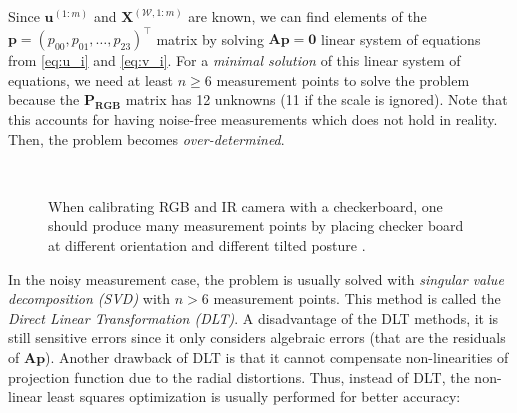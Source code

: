 \documentclass[12pt]{report}
\numberwithin{figure}{section}
\begin{document}
Since $\mathbf{u}^{(1:m)}$ and $\mathbf{X}^{(\mathcal{W}, 1:m)}$ are known, we 
can 
find 
elements of the 
$\mathbf{p} = (p_{00}, p_{01}, \dots, p_{23})^\top$ matrix by solving 
$\mathbf{Ap=0}$ linear system of equations from \eqref{eq:u_i} and 
\eqref{eq:v_i}.  
For a \textit{minimal solution} of this linear system of equations, we need at 
least $n \geq 6$ measurement points to solve the problem because the 
$\mathbf{P_{RGB}}$ matrix has 12 unknowns (11 if the scale is ignored).  Note 
that 
this accounts for having noise-free measurements which does not hold in 
reality. Then, the problem becomes \textit{over-determined}.

\begin{figure}[H]
\centering
{} \\
\caption[Checkboard Calibration for RGB and IR Camera]{When calibrating RGB 
and IR camera with a checkerboard, one should produce many measurement points 
by placing checker board at different orientation and different tilted 
posture \parencite{Karan2015}.}
\label{fig:checkerboard_rgb_ir}
\end{figure}


In the noisy measurement case, the problem is usually solved with 
\textit{singular 
value decomposition (SVD)} with $n > 6$ measurement points.  This method is 
called the \textit{Direct Linear Transformation (DLT)}. A disadvantage of the 
DLT methods, it is still sensitive errors since it only considers algebraic 
errors (that are the residuals of $\mathbf{Ap}$).  Another drawback of DLT is 
that it cannot compensate non-linearities of projection function due to the 
radial distortions.  Thus, instead of DLT, the non-linear least squares 
optimization is usually performed for better accuracy:
\end{document}
